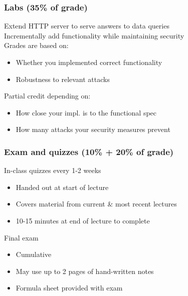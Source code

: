 \documentclass[10pt]{beamer}
\begin{document}

\begin{frame}

\frametitle{Labs (35\% of grade)}

Extend HTTP server to serve answers to data queries
\\[1em]

Incrementally add functionality while maintaining security
\\[1em]

Grades are based on:
\begin{itemize}
\item Whether you implemented correct functionality
\item Robustness to relevant attacks\\[1em]
\end{itemize}

Partial credit depending on:
\begin{itemize}
  \item How close your impl. is to the functional spec
  \item How many attacks your security measures prevent
\end{itemize}

\end{frame}


\begin{frame}

\frametitle{Exam and quizzes (10\% + 20\% of grade)}

In-class quizzes every 1-2 weeks
\begin{itemize}
\item Handed out at start of lecture
\item Covers material from current \& most recent lectures
\item 10-15 minutes at end of lecture to complete\\[1em]
\end{itemize}

Final exam
\begin{itemize}
\item Cumulative
\item May use up to 2 pages of hand-written notes
\item Formula sheet provided with exam
\end{itemize}

\end{frame}
\end{document}
